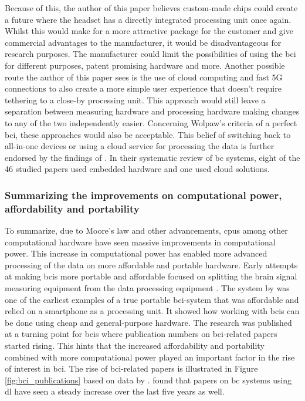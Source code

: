 Because of this, the author of this paper believes custom-made chips could create a future where the headset has a directly integrated processing unit once again.
Whilst this would make for a more attractive package for the customer and give commercial advantages to the manufacturer, it would be disadvantageous for research purposes.
The manufacturer could limit the possibilities of using the \gls{bci} for different purposes, patent promising hardware and more.
Another possible route the author of this paper sees is the use of cloud computing and fast 5G connections to also create a more simple user experience that doesn't require  tethering to a close-by processing unit.
This approach would still leave a separation between measuring hardware and processing hardware making changes to any of the two independently easier.
Concerning Wolpaw's criteria of a perfect \gls{bci}, these approaches would also be acceptable.
This belief of switching back to all-in-one devices or using a cloud service for processing the data is further endorsed by the findings of \citet{bci_review_arnau}.
In their systematic review of \gls{bc} systems, eight of the 46 studied papers used embedded hardware and one used cloud solutions.


\subsubsection{Summarizing the improvements on computational power, affordability and portability}
\label{subsubsec:bci_gaining_popularity_better_processing_summary}

To summarize, due to Moore's law \citep{moores_law} and other advancements, \glspl{cpu} among other computational hardware have seen massive improvements in computational power.
This increase in computational power has enabled more advanced processing of the data on more affordable and portable hardware.
Early attempts at making \glspl{bci} more portable and affordable focused on splitting the brain signal measuring equipment from the data processing equipment \citep{early_bci_drowsiness, early_bci_multimedia}.
The system by \citet{early_bci_phone} was one of the earliest examples of a true portable \gls{bci}-system that was affordable and relied on a smartphone as a processing unit.
It showed how working with \glspl{bci} can be done using cheap and general-purpose hardware.
The research was published at a turning point for \glspl{bci} where publication numbers on \gls{bci}-related papers started rising.
This hints that the increased affordability and portability combined with more computational power played an important factor in the rise of interest in \gls{bci}. 
The rise of \gls{bci}-related papers is illustrated in Figure \ref{fig:bci_publications} based on data by \citet{bci_progress_overview}.
 found that papers on \gls{bc} systems using \gls{dl} have seen a steady increase over the last five years as well. 

